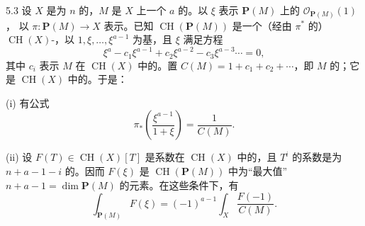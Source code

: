 \begin{SGAresult}{}{5.3}
设 $X$ 是为 $n$ 的，$M$ 是 $X$ 上一个 $a$ 的。以 $\xi$ 表示 $\mathbf P(M)$ 上的 $\mathcal O_{\mathbf P(M)}(1)$，
以 $\pi:\mathbf P(M)\longrightarrow X$ 表示。已知 $\operatorname{CH}(\mathbf P(M))$ 是一个（经由 $\pi^*$ 的） $\operatorname{CH}(X)$-，以 $1,\xi,\ldots,\xi^{a-1}$ 为基，且 $\xi$ 满足方程
\[
\xi^a-c_1\xi^{a-1}+c_2\xi^{a-2}-c_3\xi^{a-3}\cdots=0,
\tag{5.3.1}
\]
其中 $c_i$ 表示 $M$ 在 $\operatorname{CH}(X)$ 中的。置
$C(M)=1+c_1+c_2+\cdots$，即 $M$ 的；它是 $\operatorname{CH}(X)$ 中的。于是：

\textup{(i)} 有公式
\[
\pi_*\left(\frac{\xi^{a-1}}{1+\xi}\right)=\frac1{C(M)}.
\tag{5.3.2}
\]

\textup{(ii)} 设 $F(T)\in\operatorname{CH}(X)[T]$ 是系数在 $\operatorname{CH}(X)$ 中的，且 $T^i$ 的系数是为 $n+a-1-i$ 的。因而 $F(\xi)$ 是 $\operatorname{CH}(\mathbf P(M))$ 中为“最大值”$n+a-1=\dim\mathbf P(M)$ 的元素。在这些条件下，有
\[
\int_{\mathbf P(M)}F(\xi)=(-1)^{a-1}\int_X\frac{F(-1)}{C(M)}.
\tag{5.3.3}
\]
\end{SGAresult}
